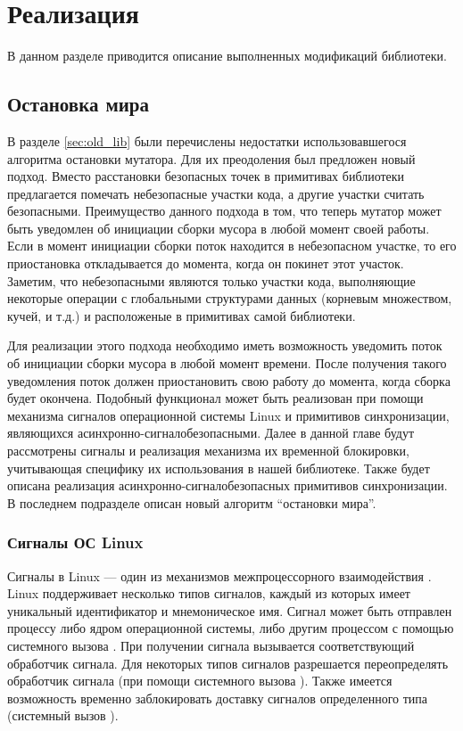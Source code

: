 \section{Реализация}

В данном разделе приводится описание выполненных модификаций библиотеки.


\subsection{Остановка мира}
\label{sec:stw}
В разделе \ref{sec:old_lib} были перечислены недостатки использовавшегося алгоритма 
остановки мутатора. 
Для их преодоления был предложен новый подход. 
Вместо расстановки безопасных точек в примитивах библиотеки предлагается помечать 
небезопасные участки кода, а другие участки считать безопасными. 
Преимущество данного подхода в том, что теперь мутатор может быть уведомлен об инициации 
сборки мусора в любой момент своей работы. 
Если в момент инициации сборки поток находится в небезопасном участке, то его приостановка 
откладывается до момента, когда он покинет этот участок. 
Заметим, что небезопасными являются только участки кода, выполняющие некоторые операции с 
глобальными структурами данных (корневым множеством, кучей, и т.д.) и расположеные в 
примитивах самой библиотеки.

Для реализации этого подхода необходимо иметь возможность уведомить поток об инициации 
сборки мусора в любой момент времени. 
После получения такого уведомления поток должен приостановить свою работу до момента, 
когда сборка будет окончена. 
Подобный функционал может быть реализован при помощи механизма сигналов операционной системы 
Linux и примитивов синхронизации, являющихся асинхронно-сигналобезопасными. 
Далее в данной главе будут рассмотрены сигналы и реализация механизма их временной блокировки, 
учитывающая специфику их использования в нашей библиотеке. 
Также будет описана реализация асинхронно-сигналобезопасных примитивов синхронизации. 
В последнем подразделе описан новый алгоритм ``остановки мира''. 


\subsubsection{Сигналы ОС Linux}
Сигналы в Linux --- один из механизмов межпроцессорного взаимодействия \cite{book:os_linux}. 
Linux поддерживает несколько типов сигналов, каждый из которых имеет уникальный идентификатор 
и мнемоническое имя. 
Сигнал может быть отправлен процессу либо ядром операционной системы, либо другим процессом 
с помощью системного вызова . 
При получении сигнала вызывается соответствующий обработчик сигнала. 
Для некоторых типов сигналов разрешается переопределять обработчик сигнала (при помощи 
системного вызова ). 
Также имеется возможность временно заблокировать доставку сигналов определенного типа 
(системный вызов ).

